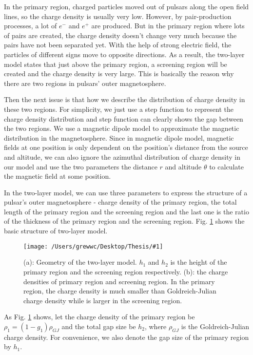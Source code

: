 \documentclass[12pt]{report}
\newcommand{\singleFig}[3]{
  \begin{figure}[!ht]
    \centering
    \texttt{[image: /Users/grewwc/Desktop/Thesis/\#1]}
    \caption{#3}
    \label{fig: #1}
  \end{figure}
}
\newcommand{\myComment}[1]{
  \newline
}
\begin{document}
        In the primary region, charged particles moved out of pulsars along the open field 
        lines, 
        so the charge density is usually very low. 
        However, by pair-production processes, a lot of $e^{-}$ and $e^{+}$ are produced. 
        But in the primary region where lots of pairs are created, the charge density 
        doesn't 
        change very much because the pairs have not been separated yet. With the help of 
        strong 
        electric field, the particles of different signs move to opposite directions. 
        As a result, the two-layer model states that just above the primary region, a 
        screening 
        region will be created and the charge density is very large. This is basically the reason why 
        there are two regions in pulsars' outer magnetosphere.

        Then the next issue is that how we describe the distribution of charge density in these two regions. 
        For simplicity, we just use a step function to represent the charge density distribution and step function 
        can clearly shows the gap between the two regions. We use a magnetic dipole model to approximate the 
        magnetic distribution in the magnetosphere. Since in magnetic dipole model, magnetic fields at one 
        position is only dependent on the position's distance from the source and altitude, we can 
        also ignore the azimuthal distribution of charge density in our model and use the two parameters
        the distance $r$ and altitude $\theta$ to calculate the magnetic field at some position.

        In the two-layer model, we can use three parameters to express the structure of a pulsar's outer 
        magnetosphere - charge density of the primary region, the total length of the primary region and the 
        screening region and the last one is the ratio of the thickness of the primary region and the 
        screening region. Fig. \ref{fig: charge_density} shows the basic structure of two-layer model. 

        \singleFig{charge_density}{0.6}{(a): Geometry of the two-layer model. $h_{1}$ and $h_{2}$ is the height
        of the primary region and the screening region respectively. (b): the charge densities of primary region and 
        screening region. In the primary region, the charge density is much smaller than Goldreich-Julian charge density
        while is larger in the screening region.}

        As Fig. \ref{fig: charge_density} shows, 
        let the charge density of the primary region be $\rho_1 = (1-g_{1}) \rho_{GJ}$ and 
        the total gap size be
        $h_{2}$, where $\rho_{GJ}$ is the Goldreich-Julian charge density. For convenience, 
        we also denote the gap size of the primary region by $h_{1}$. 
        \myComment{Then we can calculate electric potential and electric field by solving the Poisson equation }
\end{document}
